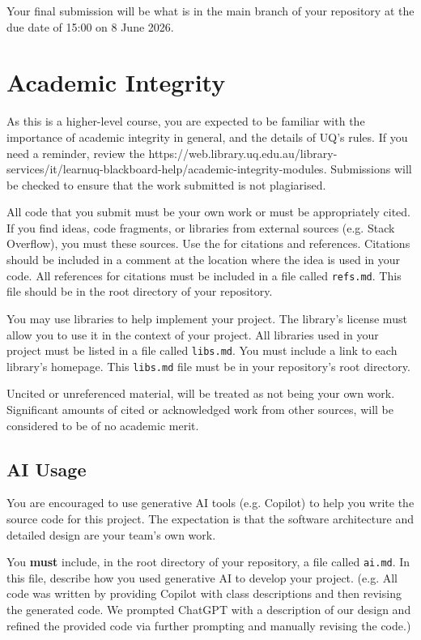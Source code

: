 \documentclass{csse4400}
\begin{document}
Your final submission will be what is in the main branch of your repository at the due date of 15:00 on 8 June 2026.


\section{Academic Integrity}
As this is a higher-level course, you are expected to be familiar with the importance of academic integrity in general,
and the details of UQ's rules.
If you need a reminder, review the 
{https://web.library.uq.edu.au/library-services/it/learnuq-blackboard-help/academic-integrity-modules}.
Submissions will be checked to ensure that the work submitted is not plagiarised.

All code that you submit must be your own work or must be appropriately cited.
If you find ideas, code fragments, or libraries from external sources (e.g. Stack Overflow),
you must  these sources.
Use the  for citations and references.
Citations should be included in a comment at the location where the idea is used in your code.
All references for citations must be included in a file called \texttt{refs.md}.
This file should be in the root directory of your repository.

You may use libraries to help implement your project.
The library's license must allow you to use it in the context of your project.
All libraries used in your project must be listed in a file called \texttt{libs.md}.
You must include a link to each library's homepage.
This \texttt{libs.md} file must be in your repository's root directory.

Uncited or unreferenced material, will be treated as not being your own work.
Significant amounts of cited or acknowledged work from other sources, will be considered to be of no academic merit.

\subsection{AI Usage}
You are encouraged to use generative AI tools (e.g. Copilot) to help you write the source code for this project.
The expectation is that the software architecture and detailed design are your team's own work.

You \textbf{must} include, in the root directory of your repository, a file called \texttt{ai.md}.
In this file, describe how you used generative AI to develop your project.
(e.g. All code was written by providing Copilot with class descriptions and then revising the generated code.
We prompted ChatGPT with a description of our design
and refined the provided code via further prompting and manually revising the code.)
\end{document}
